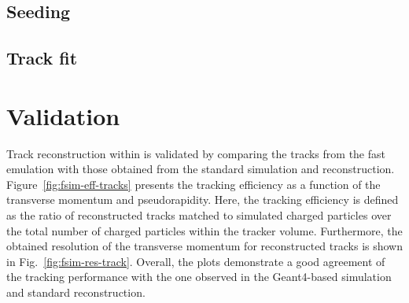 \subsection{Seeding}


\subsection{Track fit}


\section{Validation}
\label{sec:fsim-validation}

Track reconstruction within \FSIM is validated by comparing the tracks from the fast emulation with those obtained from the standard simulation and reconstruction. Figure~\ref{fig:fsim-eff-tracks} presents the tracking efficiency as a function of the transverse momentum and pseudorapidity. Here, the tracking efficiency is defined as the ratio of reconstructed tracks matched to simulated charged particles over the total number of charged particles within the tracker volume. Furthermore, the obtained resolution of the transverse momentum for reconstructed tracks is shown in Fig.~\ref{fig:fsim-res-track}. Overall, the plots demonstrate a good agreement of the \FSIM tracking performance with the one observed in the Geant4-based simulation and standard reconstruction.

